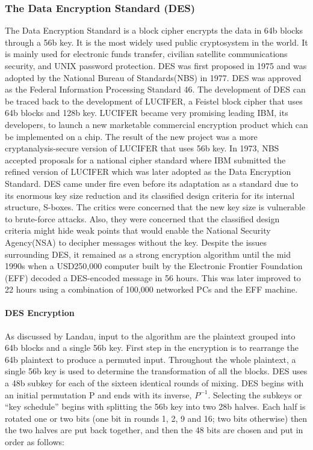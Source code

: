 \documentclass{article}
\begin{document}
\subsubsection{The Data Encryption Standard (DES)}
The Data Encryption Standard is a block cipher encrypts the data in 64b blocks through a 56b key. It is the most widely used public cryptosystem in the world. It is mainly used for electronic funds transfer, civilian satellite communications security, and UNIX password protection.\cite{landau2000} DES was first proposed in 1975 and was adopted by the National Bureau of Standards(NBS) in 1977. DES was approved as the Federal Information Processing Standard 46. \cite{stallings2011}
	The development of DES can be traced back to the development of LUCIFER, a Feistel block cipher that uses 64b blocks and 128b key. LUCIFER became very promising leading IBM, its developers, to launch a new marketable commercial encryption product which can be implemented on a chip. The result of the new project was a more cryptanalysis-secure version of LUCIFER that uses 56b key. In 1973, NBS accepted proposals for a national cipher standard where IBM submitted the refined version of LUCIFER which was later adopted as the Data Encryption Standard.\cite{stallings2011}
	DES came under fire even before its adaptation as a standard due to its enormous key size reduction and its classified design criteria for its internal structure, S-boxes. The critics were concerned that the new key size is vulnerable to brute-force attacks. Also, they were concerned that the classified  design criteria might hide weak points that would enable the National Security Agency(NSA) to decipher messages without the key.\cite{stallings2011} Despite the issues surrounding DES, it remained as a strong  encryption algorithm until the mid 1990s when a USD250,000 computer built by the Electronic Frontier Foundation (EFF) decoded a DES-encoded message in 56 hours. This was later improved to 22 hours using a combination of 100,000 networked PCs and the EFF machine.\cite{landau2000}

\paragraph{DES Encryption}
As discussed by Landau\cite{landau2000}, input to the algorithm are the plaintext grouped into 64b blocks and a single 56b key. First step in the encryption is to rearrange the 64b plaintext to produce a permuted input.  Throughout the whole plaintext, a single 56b key is used to determine the transformation of all the blocks. DES uses a 48b subkey for each of the sixteen identical rounds of mixing. DES begins with  an initial permutation P and ends with its inverse, $P^{-1}$. Selecting the subkeys or “key schedule” begins with splitting the 56b key into two 28b halves. Each half is rotated one or two bits (one bit in rounds 1, 2, 9 and 16; two bits otherwise) then the two halves are put back together, and then the 48 bits are chosen and put in order as follows:
\end{document}
